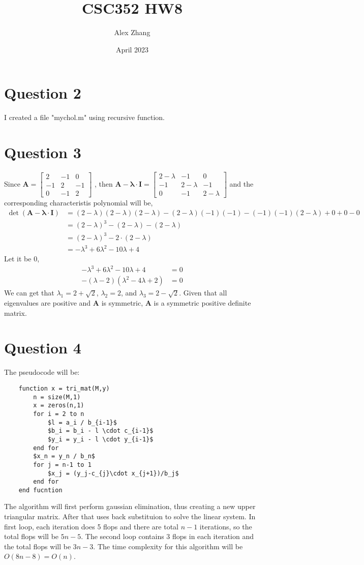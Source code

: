 \documentclass{article}
\title{CSC352 HW8}
\author{Alex Zhang}
\date{April 2023}
\newcommand{\bmat}[1]{\begin{bmatrix} #1 \end{bmatrix}}
\newcommand{\mat}[1]{\mathbf{#1}}
\begin{document}
\maketitle
\section*{Question 2}
I created a file "my\textunderscore chol.m" using recursive function.

\section*{Question 3}
Since $\mat{A} = \bmat{2 & -1 & 0\\
                        -1 & 2 & -1\\
                        0 & -1 & 2}$
, then $\mat{A - \lambda \cdot I} =\bmat{2-\lambda & -1 & 0\\
-1 & 2-\lambda & -1\\
0 & -1 & 2-\lambda}$ and the corresponding characteristis polynomial will be,
\begin{align}
    \det(\mat{A - \lambda \cdot I}) &= (2-\lambda)(2-\lambda)(2-\lambda) -(2-\lambda)(-1)(-1) - (-1)(-1)(2-\lambda) + 0  + 0 - 0 \nonumber \\ 
    &= (2-\lambda)^3 - (2-\lambda) - (2-\lambda) \nonumber \\
    &= (2-\lambda)^3 - 2 \cdot (2-\lambda) \nonumber \\
    &= -\lambda^3 + 6\lambda^2 - 10 \lambda + 4 \nonumber
\end{align}
Let it be 0,
\begin{align}
    -\lambda^3 + 6\lambda^2 - 10 \lambda + 4 &= 0 \nonumber \\
    -(\lambda-2)(\lambda^2 - 4\lambda +2) &= 0 \nonumber
\end{align}
We can get that $\lambda_1 = 2+ \sqrt{2}$, $\lambda_2 = 2$, and $\lambda_3 = 2- \sqrt{2}$. Given that all eigenvalues
are positive and $\mat{A}$ is symmetric, $\mat{A}$ is a symmetric positive definite matrix.





\section*{Question 4}
The pseudocode will be:
\begin{lstlisting}
    function x = tri_mat(M,y)
        n = size(M,1)
        x = zeros(n,1)
        for i = 2 to n
            $l = a_i / b_{i-1}$
            $b_i = b_i - l \cdot c_{i-1}$
            $y_i = y_i - l \cdot y_{i-1}$
        end for
        $x_n = y_n / b_n$
        for j = n-1 to 1
            $x_j = (y_j-c_{j}\cdot x_{j+1})/b_j$
        end for
    end fucntion
\end{lstlisting}
The algorithm will first perform gaussian elimination, thus creating a new upper triangular matrix.
After that uses back substituion to solve the linear system. In first loop, each iteration does 5 flops and 
there are total $n-1$ iterations, so the total flops will be $5n - 5$.
The second loop contains 3 flops in each iteration and the total flops will be $3n -3$. The time complexity 
for this algorithm will be $O(8n-8) = O(n)$.
\end{document}
